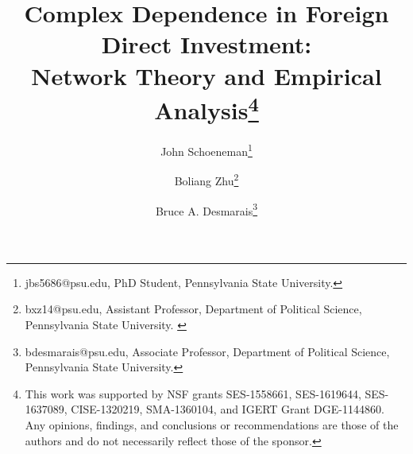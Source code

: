 \documentclass[reqno,onecolumn,letterpaper,12pt]{article}
\begin{document}
\title{Complex Dependence in Foreign Direct Investment: \\Network Theory and Empirical Analysis\footnote{This work was supported by NSF grants SES-1558661, SES-1619644,
 SES-1637089, CISE-1320219, SMA-1360104, and IGERT Grant DGE-1144860. Any opinions, findings, and conclusions or recommendations are those of the authors and
 do not necessarily reflect those of the sponsor.}}
\author{John  Schoeneman\thanks{\footnotesize{
jbs5686@psu.edu, PhD Student, Pennsylvania State University.}} \and Boliang Zhu\thanks{\footnotesize{bxz14@psu.edu, Assistant Professor, Department of Political
Science, Pennsylvania State University. }} \and Bruce A. Desmarais\thanks{\footnotesize{
bdesmarais@psu.edu, Associate Professor, Department of Political Science, Pennsylvania State University.}}}
\date{}
\maketitle
\end{document}
